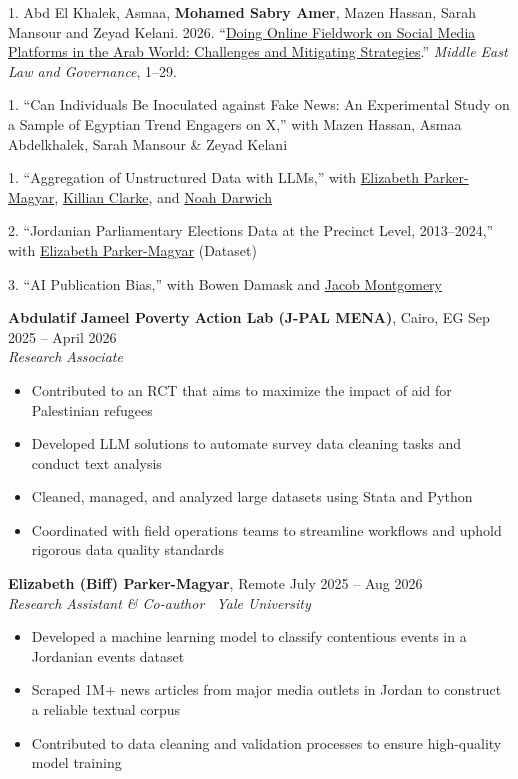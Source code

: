 \documentclass[10pt,a4paper]{article}
\newcommand{\cvsection}[1]{%
  \par\vspace{1.8ex}%
  \noindent\makebox[0pt][r]{\makebox[25mm][l]{\smash{\parbox[t]{24.5mm}{\raggedright\scshape #1}}}}%
  \ignorespaces
}
\newenvironment{cvitems}{%
  \begin{itemize}%
  \setlength{\itemsep}{1pt}%
  \setlength{\parskip}{0pt}%
  \setlength{\parsep}{0pt}%
  \setlength{\topsep}{1.5pt}%
  \setlength{\partopsep}{0pt}%
  \setlength{\leftmargin}{15pt}%
  \setlength{\labelwidth}{8pt}%
  \setlength{\labelsep}{5pt}%
}{%
  \end{itemize}%
}
\begin{document}
\cvsection{Publications}%
1. Abd El Khalek, Asmaa, \textbf{Mohamed Sabry Amer}, Mazen Hassan, Sarah Mansour and Zeyad Kelani. 2026. ``\href{https://doi.org/10.1163/18763375-bja10026}{Doing Online Fieldwork on Social Media Platforms in the Arab World: Challenges and Mitigating Strategies}.'' \textit{Middle East Law and Governance}, 1--29.

\cvsection{Working\\Papers}%
1. ``Can Individuals Be Inoculated against Fake News: An Experimental Study on a Sample of Egyptian Trend Engagers on X,'' with Mazen Hassan, Asmaa Abdelkhalek, Sarah Mansour \& Zeyad Kelani

\cvsection{In Progress}%
1. ``Aggregation of Unstructured Data with LLMs,'' with \href{https://biffpm.github.io}{Elizabeth Parker-Magyar}, \href{https://www.killianclarke.com/}{Killian Clarke}, and \href{https://www.noahdarwich.com/}{Noah Darwich}

\vspace{0.7ex}
2. ``Jordanian Parliamentary Elections Data at the Precinct Level, 2013--2024,'' with \href{https://biffpm.github.io}{Elizabeth Parker-Magyar} (Dataset)

\vspace{0.7ex}
3. ``AI Publication Bias,'' with Bowen Damask and \href{https://sites.wustl.edu/montgomery/}{Jacob Montgomery}

\cvsection{Research\\Experience}%
\textbf{Abdulatif Jameel Poverty Action Lab (J-PAL MENA)}, Cairo, EG \hfill Sep 2025 -- April 2026\\
\textit{Research Associate}
\begin{cvitems}
    \item Contributed to an RCT that aims to maximize the impact of aid for Palestinian refugees
    \item Developed LLM solutions to automate survey data cleaning tasks and conduct text analysis
    \item Cleaned, managed, and analyzed large datasets using Stata and Python
    \item Coordinated with field operations teams to streamline workflows and uphold rigorous data quality standards
\end{cvitems}

\vspace{0.7ex}
\textbf{Elizabeth (Biff) Parker-Magyar}, Remote \hfill July 2025 -- Aug 2026\\
\textit{Research Assistant \& Co-author \textbar\ Yale University}
\begin{cvitems}
    \item Developed a machine learning model to classify contentious events in a Jordanian events dataset
    \item Scraped 1M+ news articles from major media outlets in Jordan to construct a reliable textual corpus
    \item Contributed to data cleaning and validation processes to ensure high-quality model training
\end{cvitems}
\end{document}
